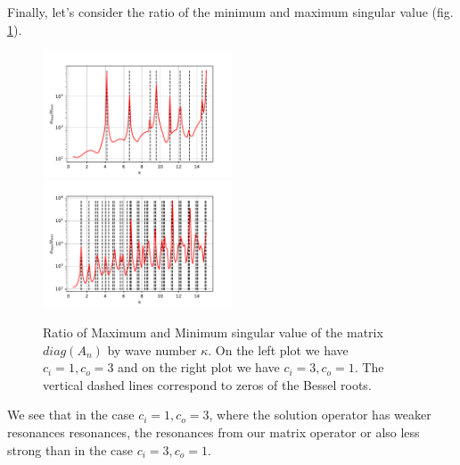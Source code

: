 \documentclass[10pt,journal,compsoc, onecolumn]{IEEEtran}
\begin{document}
Finally, let's consider the ratio of the minimum and maximum singular value (fig. \ref{fig:ratio_sing_val}).
\begin{figure}
    \includegraphics[width=0.5\textwidth]{scenario1Ratio.pdf}
    \includegraphics[width=0.5\textwidth]{scenario2Ratio.pdf}
    \caption{Ratio of Maximum and Minimum singular value of the matrix $diag(A_n)$ by wave number $\kappa$. 
    On the left plot we have $c_i = 1, c_o = 3$ 
    and on the right plot we have $c_i = 3, c_o = 1.$ The vertical dashed lines correspond to zeros of the Bessel roots. }
   \label{fig:ratio_sing_val}
\end{figure}
We see that in the case $c_i = 1, c_o =3$, where the solution operator has weaker resonances resonances, 
the resonances from our matrix operator or also less strong 
than in the case $c_i = 3, c_o =1$.


%
%
%
\end{document}
